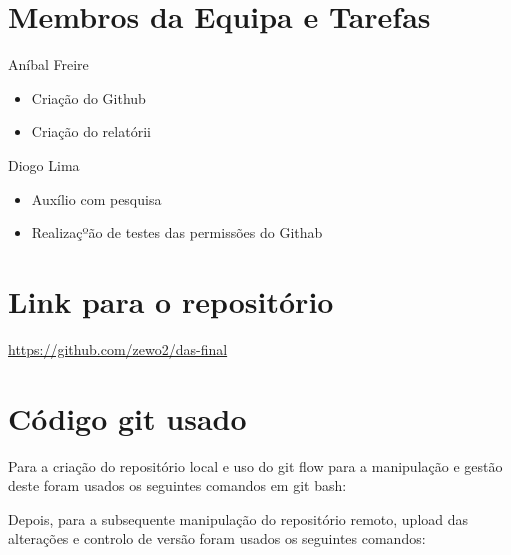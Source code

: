 \documentclass[a4paper,12pt]{article}
\begin{document}
\section{Membros da Equipa e Tarefas}

Aníbal Freire
\begin{itemize}
    \item Criação do Github
    \item Criação do relatórii
\end{itemize}
\vspace{0.2cm}

\noindent
Diogo Lima
\begin{itemize}
    \item Auxílio com pesquisa
    \item Realizaçºão de testes das permissões do Githab
\end{itemize}
\vspace{0.2cm}

\newpage
\section{Link para o repositório}

\url{https://github.com/zewo2/das-final}

\section{Código git usado}

Para a criação do repositório local e uso do git flow para a manipulação e gestão deste foram usados os seguintes comandos em git bash:

\vspace{0.3cm}

\noindent{}

\vspace{0.3cm}

Depois, para a subsequente manipulação do repositório remoto, upload das alterações e controlo de versão foram usados os seguintes comandos:

\vspace{0.3cm}
\end{document}
